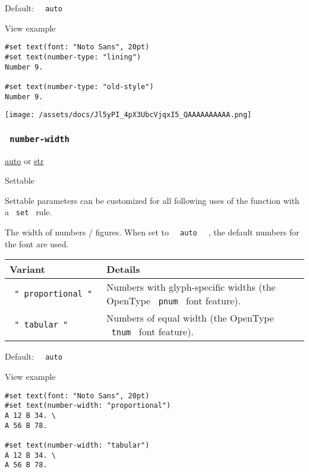 Default: \texttt{\ }{\texttt{\ auto\ }}\texttt{\ }


View example

\begin{verbatim}
#set text(font: "Noto Sans", 20pt)
#set text(number-type: "lining")
Number 9.

#set text(number-type: "old-style")
Number 9.
\end{verbatim}

\texttt{[image: /assets/docs/Jl5yPI\_4pX3UbcVjqxI5\_QAAAAAAAAAA.png]}

\subsubsection{\texorpdfstring{\texttt{\ number-width\ }}{ number-width }}\label{parameters-number-width}

\href{/docs/reference/foundations/auto/}{auto} {or}
\href{/docs/reference/foundations/str/}{str}

{{ Settable }}

\label{parameters-number-width-settable-tooltip}
Settable parameters can be customized for all following uses of the
function with a \texttt{\ set\ } rule.

The width of numbers / figures. When set to
\texttt{\ }{\texttt{\ auto\ }}\texttt{\ } , the default numbers for the
font are used.

\begin{longtable}[]{@{}ll@{}}
\toprule\noalign{}
Variant & Details \\
\midrule\noalign{}
\endhead
\bottomrule\noalign{}
\endlastfoot
\texttt{\ "\ proportional\ "\ } & Numbers with glyph-specific widths
(the OpenType \texttt{\ pnum\ } font feature). \\
\texttt{\ "\ tabular\ "\ } & Numbers of equal width (the OpenType
\texttt{\ tnum\ } font feature). \\
\end{longtable}

Default: \texttt{\ }{\texttt{\ auto\ }}\texttt{\ }


View example

\begin{verbatim}
#set text(font: "Noto Sans", 20pt)
#set text(number-width: "proportional")
A 12 B 34. \
A 56 B 78.

#set text(number-width: "tabular")
A 12 B 34. \
A 56 B 78.
\end{verbatim}

